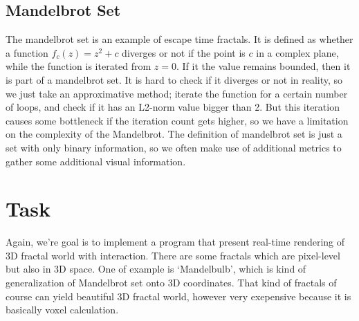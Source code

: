 \documentclass[a4paper]{article}
\begin{document}
\subsection{Mandelbrot Set}
The mandelbrot set is an example of escape time fractals.
It is defined as whether a function $f_c(z) = z^2 + c$ diverges or not if the point is $c$ in a complex plane, while the function is iterated from $z = 0$.
If it the value remains bounded, then it is part of a mandelbrot set.
It is hard to check if it diverges or not in reality, so we just take an approximative method; iterate the function for a certain number of loops, and check if it has an L2-norm value bigger than 2.
But this iteration causes some bottleneck if the iteration count gets higher, so we have a limitation on the complexity of the Mandelbrot.
The definition of mandelbrot set is just a set with only binary information, so we often make use of additional metrics to gather some additional visual information.
\begin{figure}[H]
\centering
{}
\end{figure}

\section{Task}
Again, we're goal is to implement a program that present real-time rendering of 3D fractal world with interaction.
There are some fractals which are pixel-level but also in 3D space.
One of example is `Mandelbulb', which is kind of generalization of Mandelbrot set onto 3D coordinates.
That kind of fractals of course can yield beautiful 3D fractal world, however very exepensive because it is basically voxel calculation.
\end{document}
